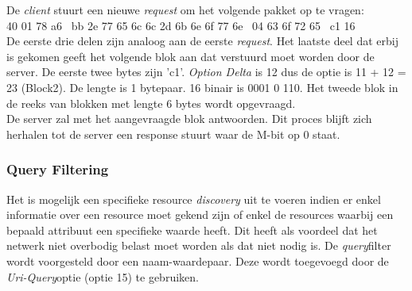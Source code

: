 \noindent
De \textit{client} stuurt een nieuwe \textit{request} om het volgende pakket op te vragen:\\
40 01 78 a6 \textbar~bb 2e 77 65 6c 6c 2d 6b 6e 6f 77 6e \textbar~04 63 6f 72 65 \textbar~c1 16\\
De eerste drie delen zijn analoog aan de eerste \textit{request}. Het laatste deel dat erbij is gekomen geeft het volgende blok aan dat verstuurd moet worden door de server. De eerste twee bytes zijn 'c1'. \textit{Option Delta} is 12 dus de optie is 11 + 12 = 23 (Block2). De lengte is 1 bytepaar. 16 binair is 0001 0 110. Het tweede blok in de reeks van blokken met lengte 6 bytes wordt opgevraagd.\\

\noindent
De server zal met het aangevraagde blok antwoorden. Dit proces blijft zich herhalen tot de server een response stuurt waar de M-bit op 0 staat.

\subsubsection{Query Filtering}
Het is mogelijk een specifieke resource \textit{discovery} uit te voeren indien er enkel informatie over een resource moet gekend zijn of enkel de resources waarbij een bepaald attribuut een specifieke waarde heeft. Dit heeft als voordeel dat het netwerk niet overbodig belast moet worden als dat niet nodig is. De \textit{query}filter wordt voorgesteld door een naam-waardepaar. Deze wordt toegevoegd door de \textit{Uri-Query}optie (optie 15) te gebruiken.

